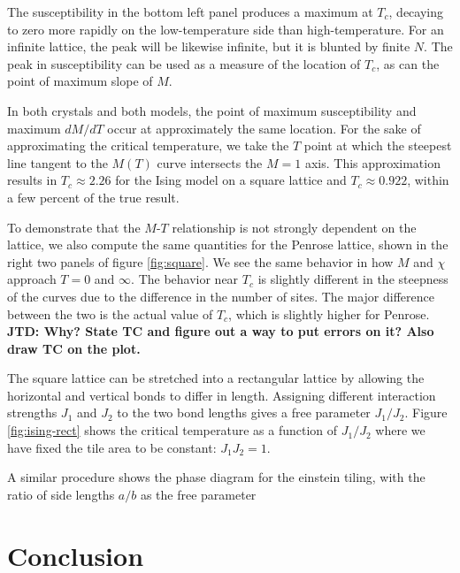 \documentclass[amsmath,amssymb,aps,twocolumn]{revtex4-2}
\newcommand{\jtd}[1]{{\color{red}\textbf{JTD: #1}}}
\begin{document}
The susceptibility in the bottom left panel produces a maximum at $T_c$, decaying to zero more rapidly on the low-temperature side than high-temperature. For an infinite lattice, the peak will be likewise infinite, but it is blunted by finite $N$. The peak in susceptibility can be used as a measure of the location of $T_c$, as can the point of maximum slope of $M$.

In both crystals and both models, the point of maximum susceptibility and maximum $dM/dT$ occur at approximately the same location. For the sake of approximating the critical temperature, we take the $T$ point at which the steepest line tangent to the $M(T)$ curve intersects the $M=1$ axis. This approximation results in $T_c\approx 2.26$ for the Ising model on a square lattice and $T_c\approx 0.922$, within a few percent of the true result.

To demonstrate that the $M$-$T$ relationship is not strongly dependent on the lattice, we also compute the same quantities for the Penrose lattice, shown in the right two panels of figure \ref{fig:square}. We see the same behavior in how $M$ and $\chi$ approach $T=0$ and $\infty$. The behavior near $T_c$ is slightly different in the steepness of the curves due to the difference in the number of sites. The major difference between the two is the actual value of $T_c$, which is slightly higher for Penrose. \jtd{Why? State TC and figure out a way to put errors on it? Also draw TC on the plot.}

The square lattice can be stretched into a rectangular lattice by allowing the horizontal and vertical bonds to differ in length. Assigning different interaction strengths $J_1$ and $J_2$ to the two bond lengths gives a free parameter $J_1/J_2$. Figure \ref{fig:ising-rect} shows the critical temperature as a function of $J_1/J_2$ where we have fixed the tile area to be constant: $J_1J_2 = 1$.

A similar procedure shows the phase diagram for the einstein tiling, with the ratio of side lengths $a/b$ as the free parameter

\section{Conclusion}


\end{document}
